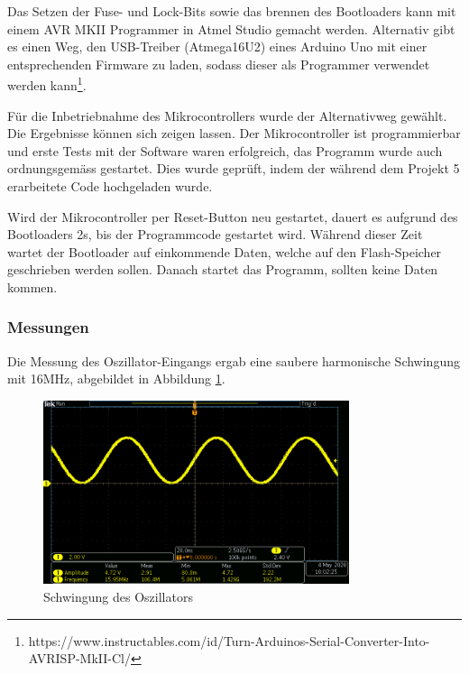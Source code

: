 Das Setzen der Fuse- und Lock-Bits sowie das brennen des Bootloaders kann mit einem AVR MKII Programmer in Atmel Studio gemacht werden. Alternativ gibt es einen Weg, den USB-Treiber (Atmega16U2) eines Arduino Uno mit einer entsprechenden Firmware zu laden, sodass dieser als Programmer verwendet werden kann\footnote{https://www.instructables.com/id/Turn-Arduinos-Serial-Converter-Into-AVRISP-MkII-Cl/}.

Für die Inbetriebnahme des Mikrocontrollers wurde der Alternativweg gewählt. Die Ergebnisse können sich zeigen lassen. Der Mikrocontroller ist programmierbar und erste Tests mit der Software waren erfolgreich, das Programm wurde auch ordnungsgemäss gestartet. Dies wurde geprüft, indem der während dem Projekt 5 erarbeitete Code hochgeladen wurde.

Wird der Mikrocontroller per Reset-Button neu gestartet, dauert es aufgrund des Bootloaders 2s, bis der Programmcode gestartet wird. Während dieser Zeit wartet der Bootloader auf einkommende Daten, welche auf den Flash-Speicher geschrieben werden sollen. Danach startet das Programm, sollten keine Daten kommen.

\subsubsection{Messungen}

Die Messung des Oszillator-Eingangs ergab eine saubere harmonische Schwingung mit 16MHz, abgebildet in Abbildung \ref{fig:Crystal_Swing}. 

\begin{figure}[h!]
\center
\includegraphics[width = 0.8\textwidth]{graphics/Crystal_Swing}
\caption{Schwingung des Oszillators}
\label{fig:Crystal_Swing}
\end{figure}